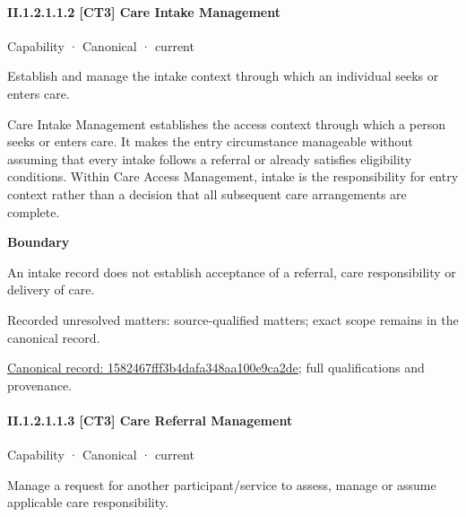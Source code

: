 \paragraph*{II.1.2.1.1.2 [CT3] Care Intake Management}
\label{navigation:II.1.2.1.1.2}

\label{element:1582467fff3b4dafa348aa100e9ca2de}
{\small Capability · Canonical · current}\par

Establish and manage the intake context through which an individual seeks or enters care.



Care Intake Management establishes the access context through which a person seeks or enters care. It makes the entry circumstance manageable without assuming that every intake follows a referral or already satisfies eligibility conditions. Within Care Access Management, intake is the responsibility for entry context rather than a decision that all subsequent care arrangements are complete.



\textbf{Boundary}



An intake record does not establish acceptance of a referral, care responsibility or delivery of care.


{\small Recorded unresolved matters: source-qualified matters; exact scope remains in the canonical record.}\par
{\footnotesize \href{../../../../../../../continuum/strategy/capability/1582467fff3b4dafa348aa100e9ca2de.md}{Canonical record: 1582467fff3b4dafa348aa100e9ca2de}; full qualifications and provenance.}\par
\paragraph*{II.1.2.1.1.3 [CT3] Care Referral Management}
\label{navigation:II.1.2.1.1.3}

\label{element:ebdaa781bba542f8b744ef34a836a269}
{\small Capability · Canonical · current}\par

Manage a request for another participant/service to assess, manage or assume applicable care responsibility.



